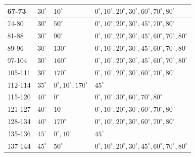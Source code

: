 \begin{table}[h]
\begin{tabular}{llll}
        \hline
        67-73                   & $30^\circ$ & $10^\circ$                     & $0^\circ, 10^\circ, 20^\circ, 30^\circ, 60^\circ, 70^\circ, 80^\circ $           \\
        \hline
        74-80                   & $30^\circ$ & $50^\circ$                     & $0^\circ, 10^\circ, 20^\circ, 30^\circ, 45^\circ, 70^\circ, 80^\circ $           \\
        \hline
        81-88                   & $30^\circ$ & $90^\circ$                     & $0^\circ, 10^\circ, 20^\circ, 30^\circ, 45^\circ, 60^\circ, 70^\circ, 80^\circ $ \\
        \hline
        89-96                   & $30^\circ$ & $130^\circ$                    & $0^\circ, 10^\circ, 20^\circ, 30^\circ, 45^\circ, 60^\circ, 70^\circ, 80^\circ $ \\
        \hline
        97-104                  & $30^\circ$ & $160^\circ$                    & $0^\circ, 10^\circ, 20^\circ, 30^\circ, 45^\circ, 60^\circ, 70^\circ, 80^\circ $ \\
        \hline
        105-111                 & $30^\circ$ & $170^\circ$                    & $0^\circ, 10^\circ, 20^\circ, 30^\circ, 60^\circ, 70^\circ, 80^\circ $           \\
        \hline
        112-114                 & $35^\circ$ & $0^\circ, 10^\circ, 170^\circ$ & $45^\circ$                                                                       \\
        \hline
        115-120                 & $40^\circ$ & $0^\circ$                      & $0^\circ, 10^\circ, 30^\circ, 60^\circ, 70^\circ, 80^\circ $                     \\
        \hline
        121-127                 & $40^\circ$ & $10^\circ$                     & $0^\circ, 10^\circ, 20^\circ, 30^\circ, 60^\circ, 70^\circ, 80^\circ $           \\
        \hline
        128-134                 & $40^\circ$ & $170^\circ$                    & $0^\circ, 10^\circ, 20^\circ, 30^\circ, 60^\circ, 70^\circ, 80^\circ $           \\
        \hline
        135-136                 & $45^\circ$ & $0^\circ, 10^\circ$            & $45^\circ$                                                                       \\
        \hline
        137-144                 & $45^\circ$ & $50^\circ$                     & $0^\circ, 10^\circ, 20^\circ, 30^\circ, 45^\circ, 60^\circ, 70^\circ, 80^\circ $ \\

\end{tabular}
\end{table}
